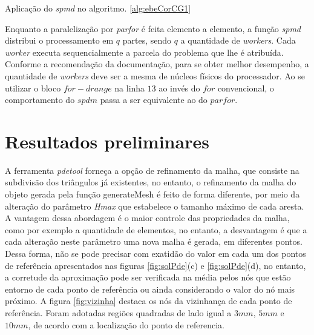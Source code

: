 \documentclass[
    12pt,               %
    openright,          %
    oneside,
    a4paper,            %
    english,            %
    french,             %
    spanish,            %
    brazil              %
    ]{abntex2}
\begin{document}
\begin{algorithm}	
	\caption{\label{alg:ebeSpmdCG1}Aplicação do \textit{spmd} no algoritmo. \ref{alg:ebeCorCG1}} 
	\begin{algorithmic}[1]

		\EndFor
		\EndFor
		\EndFor
	\end{algorithmic}
\end{algorithm}

Enquanto a paralelização por \textit{parfor} é feita elemento a elemento, a função \textit{spmd} distribui o processamento em $q$ partes, sendo $q$ a quantidade de \textit{workers}. Cada \textit{worker} executa sequencialmente a parcela do problema que lhe é atribuída. Conforme a recomendação da documentação, para se obter melhor desempenho, a quantidade de \textit{workers} deve ser a mesma de núcleos físicos do processador. Ao se utilizar o bloco $for-drange$ na linha $13$ ao invés do $for$ convencional, o comportamento do $spdm$ passa a ser equivalente ao do $parfor$.


\section{Resultados preliminares}
A ferramenta \textit{pdetool} forneça a opção de refinamento da malha, que consiste na subdivisão dos triângulos já existentes, no entanto, o refinamento da malha do objeto gerada pela função generateMesh é feito de forma diferente, por meio da alteração do parâmetro \textit{Hmax} que estabelece o tamanho máximo de cada aresta. A vantagem dessa abordagem é o maior controle das propriedades da malha, como por exemplo a quantidade de elementos, no entanto, a desvantagem é que a cada alteração neste parâmetro uma nova malha é gerada, em diferentes pontos. Dessa forma, não se pode precisar com exatidão do valor em cada um dos pontos de referência apresentados nas figuras \ref{fig:solPde}{(c)} e \ref{fig:solPde}{(d)}, no entanto, a corretude da aproximação pode ser verificada na média pelos nós que estão entorno de cada ponto de referência ou ainda considerando o valor do nó mais próximo. A figura \ref{fig:vizinha} destaca os nós da vizinhança de cada ponto de referência. Foram adotadas regiões quadradas de lado igual a $3mm$, $5mm$ e $10mm$, de acordo com a localização do ponto de referencia.
\end{document}
